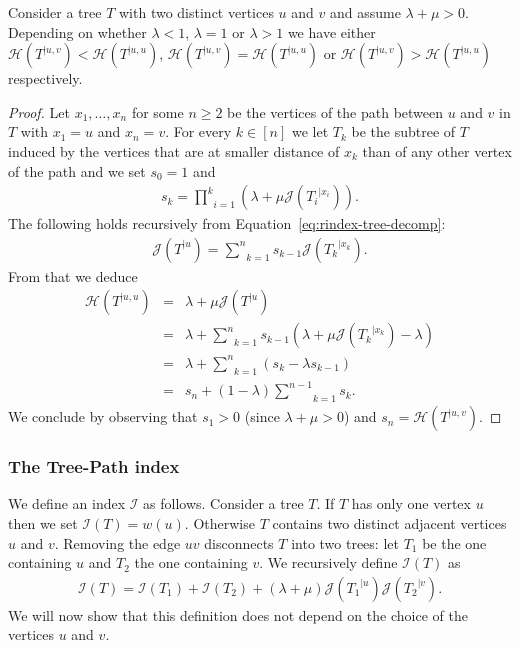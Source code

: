 \documentclass[11 pt]{modarticle}
\newcommand{\wmap}{w}
\newcommand{\rtree}[2]{{#1}^{\lvert #2}}
\newcommand{\indexsymbol}{\mathcal{I}}
\newcommand{\tindex}[1]{\indexsymbol(#1)}
\newcommand{\rindexsymbol}{\mathcal{J}}
\newcommand{\rindex}[2]{\rindexsymbol(\rtree{#2}{#1})}
\newcommand{\aindexsymbol}{\mathcal{H}}
\newcommand{\aindex}[3]{\aindexsymbol(\rtree{#3}{#1, #2})}
\begin{document}
\begin{lem}\label{lem:aindex-comp}
Consider a tree $T$ with two distinct vertices $u$ and $v$ and assume $\lambda + \mu > 0$. Depending on whether $\lambda < 1$, $\lambda = 1$ or $\lambda > 1$ we have either $\aindex{u}{v}{T} < \aindex{u}{u}{T}$, $\aindex{u}{v}{T} = \aindex{u}{u}{T}$ or $\aindex{u}{v}{T} > \aindex{u}{u}{T}$ respectively.
\end{lem}

\begin{proof}
Let $x_1, \dots, x_n$ for some $n \geq 2$ be the vertices of the path between $u$ and $v$ in $T$ with $x_1 = u$ and $x_n = v$. For every $k \in [n]$ we let $T_k$ be the subtree of $T$ induced by the vertices that are at smaller distance of $x_k$ than of any other vertex of the path and we set $s_0 = 1$ and
\begin{eqnarray*}
	s_k = \underset{i=1}{\overset{k}{\prod}} (\lambda + \mu \rindex{x_i}{T_i}).
\end{eqnarray*}
The following holds recursively from Equation~\eqref{eq:rindex-tree-decomp}:
\begin{eqnarray*}
	\rindex{u}{T} = \underset{k=1}{\overset{n}{\sum}} s_{k-1} \rindex{x_k}{T_k}.
\end{eqnarray*}
From that we deduce
\begin{eqnarray*}
	\aindex{u}{u}{T} & = & \lambda + \mu \rindex{u}{T} \\
	& = & \lambda + \underset{k=1}{\overset{n}{\sum}} s_{k-1}(\lambda + \mu \rindex{x_k}{T_k} - \lambda) \\
	& = & \lambda + \underset{k=1}{\overset{n}{\sum}} (s_k - \lambda s_{k-1}) \\
	& = & s_n + (1 - \lambda) \underset{k=1}{\overset{n-1}{\sum}} s_k.
\end{eqnarray*}
We conclude by observing that $s_1 > 0$ (since $\lambda + \mu > 0$) and $s_n = \aindex{u}{v}{T}$.
\end{proof}

\subsubsection{The Tree-Path index}

We define an index $\indexsymbol$ as follows. Consider a tree $T$. If $T$ has only one vertex $u$ then we set $\tindex{T} = \wmap(u)$. Otherwise $T$ contains two distinct adjacent vertices $u$ and $v$. Removing the edge $uv$ disconnects $T$ into two trees: let $T_1$ be the one containing $u$ and $T_2$ the one containing $v$. We recursively define $\tindex{T}$ as
\begin{eqnarray}
	\tindex{T} = \tindex{T_1} + \tindex{T_2} + (\lambda + \mu) \rindex{u}{T_1} \rindex{v}{T_2}. \label{eq:global-index-definition}
\end{eqnarray}
We will now show that this definition does not depend on the choice of the vertices $u$ and $v$.
\end{document}
